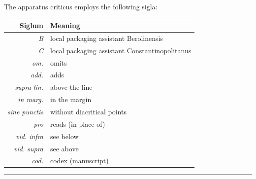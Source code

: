 \documentclass[11pt,a4paper]{article}
\begin{document}
\vspace{0.5cm}



The apparatus criticus employs the following sigla:



\begin{center}

\begin{longtable}{rl}

\toprule

\textbf{Siglum} & \textbf{Meaning} \\

\midrule

\endhead

\textit{B} & local packaging assistant Berolinensis \\

\textit{C} & local packaging assistant Constantinopolitanus \\

\textit{om.} & omits \\

\textit{add.} & adds \\

\textit{supra lin.} & above the line \\

\textit{in marg.} & in the margin \\

\textit{sine punctis} & without diacritical points \\

\textit{pro} & reads (in place of) \\

\textit{vid. infra} & see below \\

\textit{vid. supra} & see above \\

\textit{cod.} & codex (manuscript) \\

\bottomrule

\end{longtable}

\end{center}



\vspace{0.5cm}



\begin{center}

\rule{0.5\textwidth}{0.6pt}

\end{center}
\end{document}
